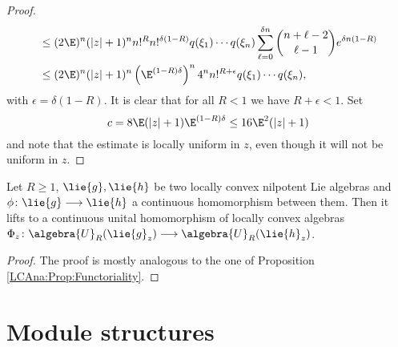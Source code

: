 \begin{proof}
\begin{align*}
        & \leq
        (2 \E)^n (|z| + 1)^n
        n!^R n!^{\delta (1 - R)}
        q(\xi_1) \cdots q(\xi_n)
        \sum\limits_{\ell = 0}^{\delta n}
        \binom{n + \ell - 2}{\ell - 1}
        e^{\delta n (1 - R)}
        \\
        & \leq
        (2 \E)^n (|z| + 1)^n
        \left(\E^{(1-R) \delta}\right)^n
        4^n n!^{R + \epsilon}
        q(\xi_1) \cdots q(\xi_n),
    \end{align*}
    with $\epsilon = \delta (1-R)$. It is clear that for all $R < 1$ we have
    $R + \epsilon < 1$. Set 
    \begin{equation*}
    	c 
    	= 
    	8 \E (|z|+1) \E^{(1-R)\delta}
    	\leq
    	16 \E^2 (|z|+1)
	\end{equation*}
	and note that the estimate is locally uniform in $z$, even
    though it will not be uniform in $z$.
\end{proof}
\begin{proposition}
	\label{Nilpot:Prop:Functoriality}
	Let $R \geq 1$, $\lie{g}, \lie{h}$ be two locally convex nilpotent Lie 
	algebras and $\phi \colon \lie{g} \longrightarrow \lie{h}$ a continuous 
	homomorphism between them. Then it lifts to a continuous unital 
	homomorphism of locally convex algebras $\Phi_z \colon 
	\algebra{U}_R(\lie{g}_z) \longrightarrow \algebra{U}_R(\lie{h}_z)$.
\end{proposition}
\begin{proof}
	The proof is mostly analogous to the one of Proposition 
	\ref{LCAna:Prop:Functoriality}.
\end{proof}



\section{Module structures}
\label{sec:chap6_Modules}

